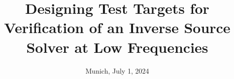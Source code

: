 %
% 
% 
%






\renewcommand{\PersonTitel}{}
\newcommand{\Datum}{\today}

\renewcommand{\PraesentationFusszeileZusatz}{}

\title{Designing Test Targets for Verification of an Inverse Source Solver at Low Frequencies}
\author{\PersonTitel{} \PersonVorname{} \PersonNachname}
\institute[]{\UniversitaetName \\ \FakultaetName \\ \LehrstuhlName}
\date[\Datum]{Munich, July 1, 2024}
\subject{}




\PraesentationMasterStandard

\PraesentationMasterKopfzeileDreizeiler
\PraesentationTitelseite %


%


